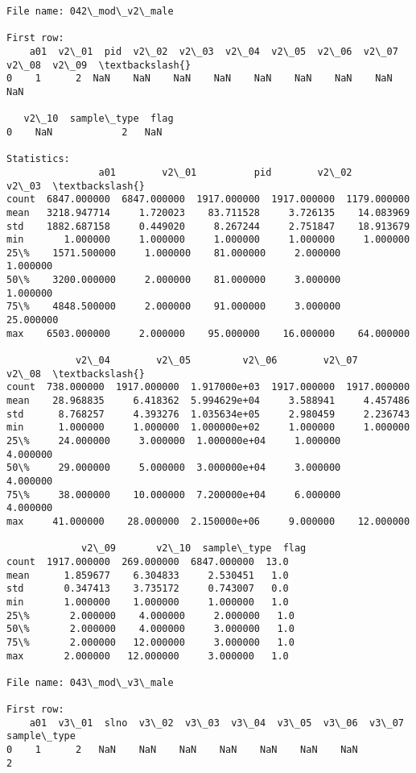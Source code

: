 \documentclass[11pt]{article}
\begin{document}
\begin{Verbatim}[commandchars=\\\{\}]
File name: 042\_mod\_v2\_male

First row: 
    a01  v2\_01  pid  v2\_02  v2\_03  v2\_04  v2\_05  v2\_06  v2\_07  v2\_08  v2\_09  \textbackslash{}
0    1      2  NaN    NaN    NaN    NaN    NaN    NaN    NaN    NaN    NaN   

   v2\_10  sample\_type  flag  
0    NaN            2   NaN  

Statistics: 
                a01        v2\_01          pid        v2\_02        v2\_03  \textbackslash{}
count  6847.000000  6847.000000  1917.000000  1917.000000  1179.000000   
mean   3218.947714     1.720023    83.711528     3.726135    14.083969   
std    1882.687158     0.449020     8.267244     2.751847    18.913679   
min       1.000000     1.000000     1.000000     1.000000     1.000000   
25\%    1571.500000     1.000000    81.000000     2.000000     1.000000   
50\%    3200.000000     2.000000    81.000000     3.000000     1.000000   
75\%    4848.500000     2.000000    91.000000     3.000000    25.000000   
max    6503.000000     2.000000    95.000000    16.000000    64.000000   

            v2\_04        v2\_05         v2\_06        v2\_07        v2\_08  \textbackslash{}
count  738.000000  1917.000000  1.917000e+03  1917.000000  1917.000000   
mean    28.968835     6.418362  5.994629e+04     3.588941     4.457486   
std      8.768257     4.393276  1.035634e+05     2.980459     2.236743   
min      1.000000     1.000000  1.000000e+02     1.000000     1.000000   
25\%     24.000000     3.000000  1.000000e+04     1.000000     4.000000   
50\%     29.000000     5.000000  3.000000e+04     3.000000     4.000000   
75\%     38.000000    10.000000  7.200000e+04     6.000000     4.000000   
max     41.000000    28.000000  2.150000e+06     9.000000    12.000000   

             v2\_09       v2\_10  sample\_type  flag  
count  1917.000000  269.000000  6847.000000  13.0  
mean      1.859677    6.304833     2.530451   1.0  
std       0.347413    3.735172     0.743007   0.0  
min       1.000000    1.000000     1.000000   1.0  
25\%       2.000000    4.000000     2.000000   1.0  
50\%       2.000000    4.000000     3.000000   1.0  
75\%       2.000000   12.000000     3.000000   1.0  
max       2.000000   12.000000     3.000000   1.0  

File name: 043\_mod\_v3\_male

First row: 
    a01  v3\_01  slno  v3\_02  v3\_03  v3\_04  v3\_05  v3\_06  v3\_07  sample\_type
0    1      2   NaN    NaN    NaN    NaN    NaN    NaN    NaN            2


\end{Verbatim}
\end{document}
